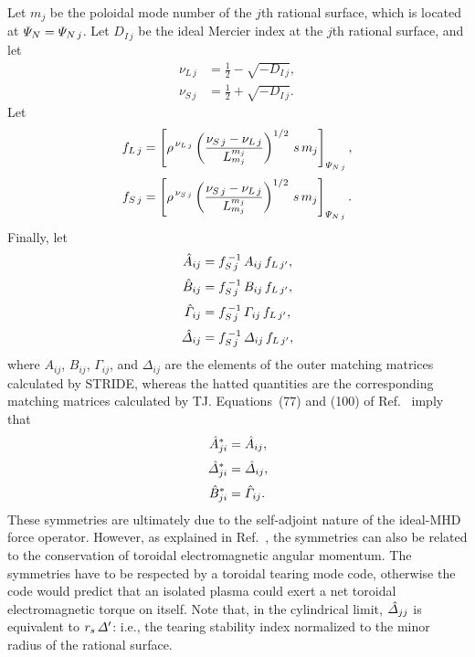 \documentclass[12pt,prb,aps,notitlepage]{revtex4-1}
\begin{document}
Let $m_j$ be the poloidal mode number of the $j$th rational surface, which is located at ${\mit\Psi}_N= {\mit\Psi}_{N\,j}$. Let $D_{I\,j}$ be the ideal
Mercier index at the $j$th rational surface, and
let
\begin{align}
\nu_{L\,j} &=\frac{1}{2}-\sqrt{-D_{I\,j}},\\[0.5ex]
\nu_{S\,j} &=\frac{1}{2}+\sqrt{-D_{I\,j}}.
\end{align}
Let
\begin{align}
f_{L\,j} &= \left[\rho^{\,\nu_{L\,j}}
\left(\frac{\nu_{S\,j}-\nu_{L\,j}}{L_{m_j}^{m_j}}\right)^{1/2}\,s\,m_j
\right]_{{\mit\Psi}_{N\,j}},\\[0.5ex]
f_{S\,j} &= \left[\rho^{\,\nu_{S\,j}}
\left(\frac{\nu_{S\,j}-\nu_{L\,j}}{L_{m_j}^{m_j}}\right)^{1/2}\,s\,m_j
\right]_{{\mit\Psi}_{N\,j}}.
\end{align}
Finally, let
\begin{align}
\hat{A}_{ij}&= f_{S\,j}^{\,-1}\,A_{ij}\,f_{L\,j'},\\[0.5ex]
\hat{B}_{ij}&= f_{S\,j}^{\,-1}\,B_{ij}\,f_{L\,j'},\\[0.5ex]
\hat{\mit\Gamma}_{ij}&= f_{S\,j}^{\,-1}\,{\mit\Gamma}_{ij}\,f_{L\,j'},\\[0.5ex]
\hat{\mit\Delta}_{ij}&= f_{S\,j}^{\,-1}\,{\mit\Delta}_{ij}\,f_{L\,j'},
\end{align}
where $A_{ij}$, $B_{ij}$, $\Gamma_{ij}$, and $\Delta_{ij}$ are the elements of the outer matching matrices
calculated by STRIDE, whereas the hatted quantities are the  corresponding matching matrices calculated by TJ. 
Equations~(77) and (100) of Ref.~ imply that
\begin{align}
\hat{A}_{ji}^\ast &= \hat{A}_{ij},\\[0.5ex]
\hat{\mit\Delta}_{ji}^\ast &= \hat{\mit\Delta}_{ij},\\[0.5ex]
\hat{B}_{ji}^\ast &= \hat{\mit\Gamma}_{ij}.
\end{align}
These symmetries are ultimately due to the self-adjoint nature of the ideal-MHD force operator. However, as explained
in Ref.~, the symmetries can also be related to the conservation of toroidal electromagnetic angular momentum. The
symmetries have to be respected by a toroidal tearing mode code, otherwise the code would predict that an isolated 
plasma could exert a net toroidal electromagnetic torque on itself. Note that, in the cylindrical limit, $\hat{\mit\Delta}_{jj}$ is equivalent to $r_s\,{\mit\Delta}'$: i.e.,
the tearing stability index normalized to the minor radius of the rational surface. 
\end{document}
